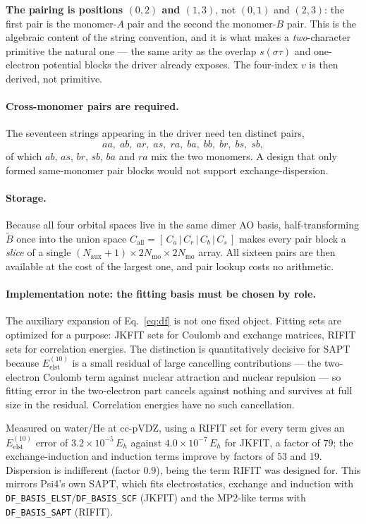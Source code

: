 \documentclass[11pt]{article}
\newcommand{\naux}{N_{\mathrm{aux}}}
\begin{document}
\noindent
\textbf{The pairing is positions $(0,2)$ and $(1,3)$}, not $(0,1)$ and $(2,3)$:
the first pair is the monomer-$A$ pair and the second the monomer-$B$ pair.
This is the algebraic content of the string convention, and it is what makes a
\emph{two}-character primitive the natural one --- the same arity as the
overlap $s(\sigma\tau)$ and one-electron potential blocks the driver already
exposes. The four-index $v$ is then derived, not primitive.

\paragraph{Cross-monomer pairs are required.} The seventeen strings appearing
in the driver need ten distinct pairs,
\[
aa,\; ab,\; ar,\; as,\; ra,\; ba,\; bb,\; br,\; bs,\; sb ,
\]
of which $ab$, $as$, $br$, $sb$, $ba$ and $ra$ mix the two monomers. A design
that only formed same-monomer pair blocks would not support
exchange-dispersion.

\paragraph{Storage.} Because all four orbital spaces live in the same dimer AO
basis, half-transforming $\tilde{B}$ once into the union space
$C_{\mathrm{all}} = [\,C_a \,|\, C_r \,|\, C_b \,|\, C_s\,]$ makes every pair
block a \emph{slice} of a single $(\naux+1)\times 2N_{\mathrm{mo}} \times
2N_{\mathrm{mo}}$ array. All sixteen pairs are then available at the cost of
the largest one, and pair lookup costs no arithmetic.

\paragraph{Implementation note: the fitting basis must be chosen by role.}
The auxiliary expansion of Eq.~\eqref{eq:df} is not one fixed object. Fitting
sets are optimized for a purpose: JKFIT sets for Coulomb and exchange matrices,
RIFIT sets for correlation energies. The distinction is quantitatively decisive
for SAPT because $E^{(10)}_{\mathrm{elst}}$ is a small residual of large
cancelling contributions --- the two-electron Coulomb term against nuclear
attraction and nuclear repulsion --- so fitting error in the two-electron part
cancels against nothing and survives at full size in the residual. Correlation
energies have no such cancellation.

Measured on water/He at cc-pVDZ, using a RIFIT set for every term gives an
$E^{(10)}_{\mathrm{elst}}$ error of $3.2\times10^{-5}\,E_h$ against
$4.0\times10^{-7}\,E_h$ for JKFIT, a factor of $79$; the exchange-induction and
induction terms improve by factors of $53$ and $19$. Dispersion is indifferent
(factor $0.9$), being the term RIFIT was designed for. This mirrors Psi4's own
SAPT, which fits electrostatics, exchange and induction with
\texttt{DF\_BASIS\_ELST}/\texttt{DF\_BASIS\_SCF} (JKFIT) and the MP2-like terms
with \texttt{DF\_BASIS\_SAPT} (RIFIT).
\end{document}
